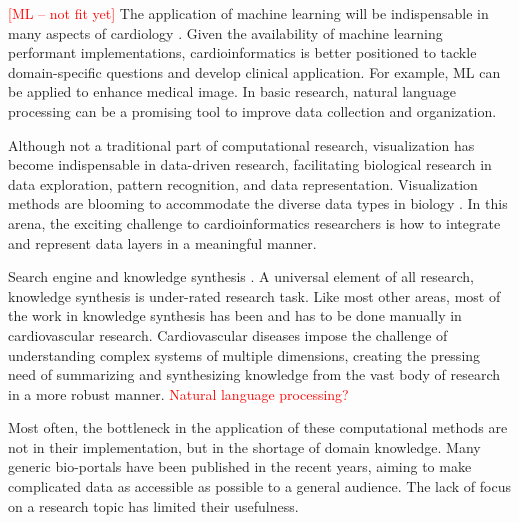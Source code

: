 \documentclass[letter]{bioinfo}
\newcommand{\comment}[1]{\textcolor{red}{#1}}
\begin{document}
%

\comment{[ML -- not fit yet]}
The application of machine learning will be indispensable in many aspects of cardiology \citep{Shameer:2017:Translational,Shameer:2018:Machine}. Given the availability of machine learning performant implementations, cardioinformatics is better positioned to tackle domain-specific questions and develop clinical application. For example, ML can be applied to enhance medical image. In basic research, natural language processing can be a promising tool to improve data collection and organization.

Although not a traditional part of computational research, visualization has become indispensable in data-driven research, facilitating biological research in data exploration, pattern recognition, and data representation. Visualization methods are blooming to accommodate the diverse data types in biology \citep{Pavlopoulos:2015:Visualizing}. In this arena, the exciting challenge to cardioinformatics researchers is how to integrate and represent data layers in a meaningful manner.


Search engine and knowledge synthesis \citep{Lutjohann:2011:Sciencenet}. A universal element of all research, knowledge synthesis is under-rated research task. Like most other areas, most of the work in knowledge synthesis has been and has to be done manually in cardiovascular research. Cardiovascular diseases impose the challenge of understanding complex systems of multiple dimensions, creating the pressing need of summarizing and synthesizing knowledge from the vast body of research in a more robust manner. \comment{Natural language processing?}


Most often, the bottleneck in the application of these computational methods are not in their implementation, but in the shortage of domain knowledge. Many generic bio-portals have been published in the recent years, aiming to make complicated data as accessible as possible to a general audience. The lack of focus on a research topic has limited their usefulness.
\end{document}
